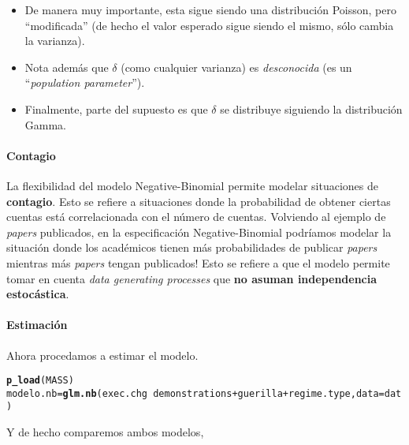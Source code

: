 \documentclass[onesided]{article}\usepackage[]{graphicx}\usepackage[]{color}
\makeatletter
\newcommand{\hlopt}[1]{\textcolor[rgb]{0,0,0}{#1}}%
\newcommand{\hlstd}[1]{\textcolor[rgb]{0.345,0.345,0.345}{#1}}%
\newcommand{\hlkwb}[1]{\textcolor[rgb]{0.69,0.353,0.396}{#1}}%
\newcommand{\hlkwc}[1]{\textcolor[rgb]{0.333,0.667,0.333}{#1}}%
\newcommand{\hlkwd}[1]{\textcolor[rgb]{0.737,0.353,0.396}{\textbf{#1}}}%
\newenvironment{kframe}{%
 \def\at@end@of@kframe{}%
 \ifinner\ifhmode%
  \def\at@end@of@kframe{\end{minipage}}%
  \begin{minipage}{\columnwidth}%
 \fi\fi%
 \def\FrameCommand##1{\hskip\@totalleftmargin \hskip-\fboxsep
 \colorbox{shadecolor}{##1}\hskip-\fboxsep
     \hskip-\linewidth \hskip-\@totalleftmargin \hskip\columnwidth}%
 \MakeFramed {\advance\hsize-\width
   \@totalleftmargin\z@ \linewidth\hsize
   \@setminipage}}%
 {\par\unskip\endMakeFramed%
 \at@end@of@kframe}
\newenvironment{knitrout}{}{} %
\makeatother
\begin{document}
\begin{itemize}
\item De manera muy importante, esta sigue siendo una distribuci\'on Poisson, pero ``modificada'' (de hecho el valor esperado sigue siendo el mismo, s\'olo cambia la varianza). 
\item Nota adem\'as que $\delta$ (como cualquier varianza) es \emph{desconocida} (es un ``\emph{population parameter}''). 
\item Finalmente, parte del supuesto es que $\delta$ se distribuye siguiendo la distribuci\'on Gamma.
\end{itemize}

\paragraph{Contagio} La flexibilidad del modelo Negative-Binomial permite modelar situaciones de {\bf contagio}. Esto se refiere a situaciones donde la probabilidad de obtener ciertas cuentas est\'a correlacionada con el n\'umero de cuentas. Volviendo al ejemplo de \emph{papers} publicados, en la especificaci\'on Negative-Binomial podr\'iamos modelar la situaci\'on donde los acad\'emicos tienen m\'as probabilidades de publicar \emph{papers} mientras m\'as \emph{papers} tengan publicados! Esto se refiere a que el modelo permite tomar en cuenta \emph{data generating processes} que {\bf no asuman independencia estoc\'astica}.

\paragraph{Estimaci\'on}  Ahora procedamos a estimar el modelo.

\begin{knitrout}
\color{fgcolor}\begin{kframe}
\begin{alltt}
\hlkwd{p_load}\hlstd{(MASS)}
\hlstd{modelo.nb} \hlkwb{=} \hlkwd{glm.nb}\hlstd{(exec.chg} \hlopt{~} \hlstd{demonstrations} \hlopt{+} \hlstd{guerilla} \hlopt{+} \hlstd{regime.type,} \hlkwc{data}\hlstd{=dat)}
\end{alltt}


{\ttfamily\noindent\bfseries\color{errorcolor}{\#\# Error in eval(predvars, data, env): objeto 'exec.chg' no encontrado}}\end{kframe}
\end{knitrout}

Y de hecho comparemos ambos modelos,
\end{document}
